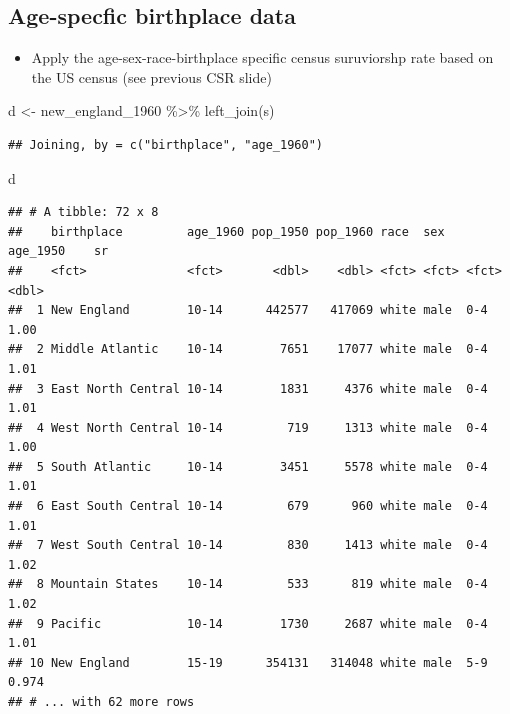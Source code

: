 \documentclass[
]{book}
\newenvironment{Shaded}{\begin{snugshade}}{\end{snugshade}}
\newcommand{\FunctionTok}[1]{\textcolor[rgb]{0.00,0.00,0.00}{#1}}
\newcommand{\NormalTok}[1]{#1}
\newcommand{\OtherTok}[1]{\textcolor[rgb]{0.56,0.35,0.01}{#1}}
\newcommand{\SpecialCharTok}[1]{\textcolor[rgb]{0.00,0.00,0.00}{#1}}
\providecommand{\tightlist}{%
  \setlength{\itemsep}{0pt}\setlength{\parskip}{0pt}}
\begin{document}
\hypertarget{age-specfic-birthplace-data-3}{%
\subsection{Age-specfic birthplace data}\label{age-specfic-birthplace-data-3}}

\begin{itemize}
\tightlist
\item
  Apply the age-sex-race-birthplace specific census suruviorshp rate based on the US census (see previous CSR slide)
\end{itemize}

\begin{Shaded}
\begin{Highlighting}[]
\NormalTok{d }\OtherTok{\textless{}{-}}\NormalTok{ new\_england\_1960 }\SpecialCharTok{\%\textgreater{}\%}
  \FunctionTok{left\_join}\NormalTok{(s)}
\end{Highlighting}
\end{Shaded}

\begin{verbatim}
## Joining, by = c("birthplace", "age_1960")
\end{verbatim}

\begin{Shaded}
\begin{Highlighting}[]
\NormalTok{d}
\end{Highlighting}
\end{Shaded}

\begin{verbatim}
## # A tibble: 72 x 8
##    birthplace         age_1960 pop_1950 pop_1960 race  sex   age_1950    sr
##    <fct>              <fct>       <dbl>    <dbl> <fct> <fct> <fct>    <dbl>
##  1 New England        10-14      442577   417069 white male  0-4      1.00 
##  2 Middle Atlantic    10-14        7651    17077 white male  0-4      1.01 
##  3 East North Central 10-14        1831     4376 white male  0-4      1.01 
##  4 West North Central 10-14         719     1313 white male  0-4      1.00 
##  5 South Atlantic     10-14        3451     5578 white male  0-4      1.01 
##  6 East South Central 10-14         679      960 white male  0-4      1.01 
##  7 West South Central 10-14         830     1413 white male  0-4      1.02 
##  8 Mountain States    10-14         533      819 white male  0-4      1.02 
##  9 Pacific            10-14        1730     2687 white male  0-4      1.01 
## 10 New England        15-19      354131   314048 white male  5-9      0.974
## # ... with 62 more rows
\end{verbatim}
\end{document}
